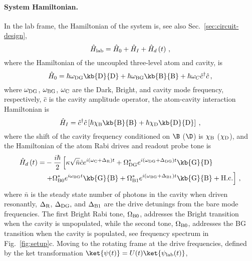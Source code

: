 \paragraph{System Hamiltonian. }

In the lab frame, the Hamiltonian of the system is, see also Sec.~\ref{sec:circuit-design},
\begin{equation}
\hat{H}_{{\rm lab}}=\hat{H}_{0}+\hat{H}_{I}+\hat{H}_{d}\left(t\right)\,,
\end{equation}
where the Hamiltonian of the uncoupled three-level atom and cavity,
is 
\begin{equation}
\hat{H}_{0}=\hbar\omega_{{\rm DG}}\kb{\rm D}{\rm D}+\hbar\omega_{{\rm BG}}\kb{\rm B}{\rm B}+\hbar\omega_{C}\hat{c}^{\dagger}\hat{c}\,,
\end{equation}
where $\omega_{{\rm DG}}$, $\omega_{{\rm BG}}$, $\omega_{{\rm C}}$
are the Dark, Bright, and cavity mode frequency, respectively, $\hat{c}$
is the cavity amplitude operator, the atom-cavity interaction Hamiltonian
is 
\begin{equation}
\hat{H}_{I}=\hat{c}^{\dagger}\hat{c}\left[\hbar\chi_{{\rm B}}\kb{\rm B}{\rm B}+\hbar\chi_{{\rm D}}\kb{\rm D}{\rm D}\right]\:,
\end{equation}
where the shift of the cavity frequency conditioned on $\B$ ($\D$)
is $\chi_{{\rm B}}$ ($\chi_{{\rm D}}$), and the Hamiltonian of the
atom Rabi drives and readout probe tone is
\begin{align}
\hat{H}_{d}\left(t\right)= & -\frac{i\hbar}{2}\left[\kappa\sqrt{\bar{n}}\hat{c}e^{i\left(\omega_{{\rm C}}+\Delta_{{\rm R}}\right)t}+\Omega_{{\rm DG}}^{*}e^{i\left(\omega_{{\rm DG}}+\Delta_{{\rm DG}}\right)t}\kb{\rm G}{\rm D}\right.\nonumber \\
 & \left.+\Omega_{{\rm B0}}^{*}e^{i\omega_{{\rm BG}}t}\kb{\rm G}{\rm B}+\Omega_{{\rm B1}}^{*}e^{i\left(\omega_{{\rm BG}}+\Delta_{{\rm B1}}\right)t}\kb{\rm G}{\rm B}+\mathrm{H.c.}\right]\,,
\end{align}
where $\bar{n}$ is the steady state number of photons in the cavity
when driven resonantly, $\Delta_{{\rm R}}$, $\Delta_{{\rm DG}},$
and $\Delta_{{\rm B1}}$ are the drive detunings from the bare mode
frequencies. The first Bright Rabi tone, $\Omega_{{\rm B0}}$, addresses
the Bright transition when the cavity is unpopulated, while the second
tone, $\Omega_{{\rm B0}}$, addresses the BG transition  when the
cavity is populated, see frequency spectrum in Fig.~\ref{fig:setup}c.
Moving to the rotating frame at the drive frequencies, defined by
the ket transformation $\ket{\psi(t)}=U(t)\ket{\psi_{\mathrm{lab}}(t)}$,
